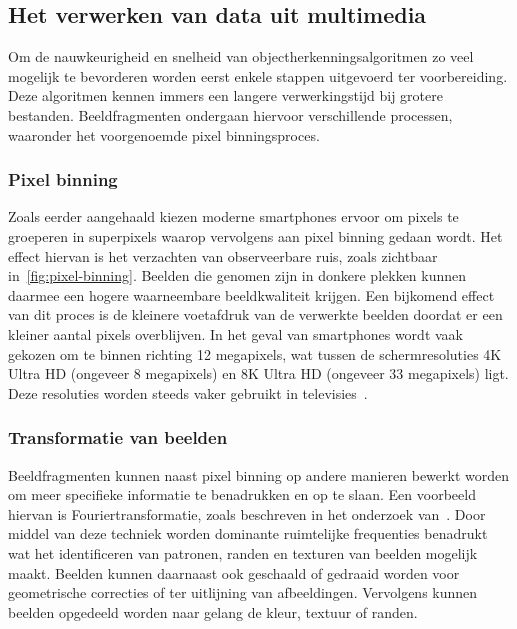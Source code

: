 \subsection{Het verwerken van data uit multimedia}\label{subsec:het-verwerken-van-data}
Om de nauwkeurigheid en snelheid van objectherkenningsalgoritmen zo veel mogelijk te bevorderen worden eerst enkele stappen uitgevoerd ter voorbereiding.
Deze algoritmen kennen immers een langere verwerkingstijd bij grotere bestanden.
Beeldfragmenten ondergaan hiervoor verschillende processen, waaronder het voorgenoemde pixel binningsproces.

\subsubsection{Pixel binning}
Zoals eerder aangehaald kiezen moderne smartphones ervoor om pixels te groeperen in superpixels waarop vervolgens aan pixel binning gedaan wordt.
Het effect hiervan is het verzachten van observeerbare ruis, zoals zichtbaar in~\ref{fig:pixel-binning}.
Beelden die genomen zijn in donkere plekken kunnen daarmee een hogere waarneembare beeldkwaliteit krijgen.
Een bijkomend effect van dit proces is de kleinere voetafdruk van de verwerkte beelden doordat er een kleiner aantal pixels overblijven.
In het geval van smartphones wordt vaak gekozen om te binnen richting 12 megapixels, wat tussen de schermresoluties 4K Ultra HD (ongeveer 8 megapixels) en 8K Ultra HD (ongeveer 33 megapixels) ligt.
Deze resoluties worden steeds vaker gebruikt in televisies~\autocite{Statista2024}.

\subsubsection{Transformatie van beelden}
Beeldfragmenten kunnen naast pixel binning op andere manieren bewerkt worden om meer specifieke informatie te benadrukken en op te slaan.
Een voorbeeld hiervan is Fouriertransformatie, zoals beschreven in het onderzoek van~\textcite{Olaoye2024}.
Door middel van deze techniek worden dominante ruimtelijke frequenties benadrukt wat het identificeren van patronen, randen en texturen van beelden mogelijk maakt.
Beelden kunnen daarnaast ook geschaald of gedraaid worden voor geometrische correcties of ter uitlijning van afbeeldingen.
Vervolgens kunnen beelden opgedeeld worden naar gelang de kleur, textuur of randen.

